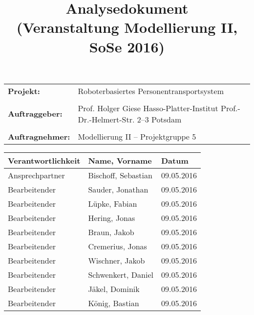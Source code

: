 \documentclass[includeheaders]{scrartcl}
\begin{document}
	
	
	
	\newpage 
	
	\title{Analysedokument\\ \small{(Veranstaltung Modellierung II, SoSe 2016)}}
	\date{}
	\author{}
	
	\maketitle
	\begin{table}[H]
		\centering
		\begin{tabular}{@{}lp{7.5cm}@{}}
			\textbf{Projekt:} & Roboterbasiertes Personentransportsystem\\
			&\\
			\textbf{Auftraggeber: }& Prof. Holger Giese \newline Hasso-Platter-Institut \newline Prof.-Dr.-Helmert-Str. 2–3 \newline 14482 Potsdam\\
			&\\
			\textbf{Auftragnehmer: }& Modellierung II – Projektgruppe 5 \\
		\end{tabular}
	\end{table}

	
	
	\newpage
	
	\begin{table}[H]
		\centering
		\begin{tabularx}{\textwidth}{@{}p{4cm}Xp{4cm}@{}}
			\toprule
			Verantwortlichkeit & Name, Vorname & Datum \\ 
			\midrule
			Ansprechpartner    & Bischoff, Sebastian & 09.05.2016 \\
			Bearbeitender      & Sauder, Jonathan & 09.05.2016 \\
			Bearbeitender      & Lüpke, Fabian & 09.05.2016 \\
			Bearbeitender      & Hering, Jonas & 09.05.2016 \\
			Bearbeitender      & Braun, Jakob & 09.05.2016  \\
			Bearbeitender      & Cremerius, Jonas & 09.05.2016 \\
			Bearbeitender      & Wischner, Jakob & 09.05.2016 \\
			Bearbeitender      & Schwenkert, Daniel & 09.05.2016 \\
			Bearbeitender      & Jäkel, Dominik & 09.05.2016 \\
			Bearbeitender      & König, Bastian & 09.05.2016 \\
			\bottomrule
		\end{tabularx}
	\end{table}
	
\end{document}
